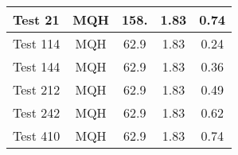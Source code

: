 \begin{table}[!h]
\begin{center}
\begin{tabular}{|l|c|c|c|c|}
Test 21    &  MQH               &  158.           &  1.83        &  0.74        \\ \hline
Test 114   &  MQH               &  62.9           &  1.83        &  0.24        \\ \hline
Test 144   &  MQH               &  62.9           &  1.83        &  0.36        \\ \hline
Test 212   &  MQH               &  62.9           &  1.83        &  0.49        \\ \hline
Test 242   &  MQH               &  62.9           &  1.83        &  0.62        \\ \hline
Test 410   &  MQH               &  62.9           &  1.83        &  0.74        \\ \hline
\end{tabular}
\end{center}
\end{table}

